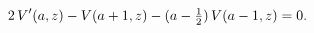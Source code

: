 \[2\mathop{V\/}\nolimits'\!\left(a,z\right)-\mathop{V\/}\nolimits\!\left(a+1,z%
\right)-(a-\tfrac{1}{2})\mathop{V\/}\nolimits\!\left(a-1,z\right)=0.\]